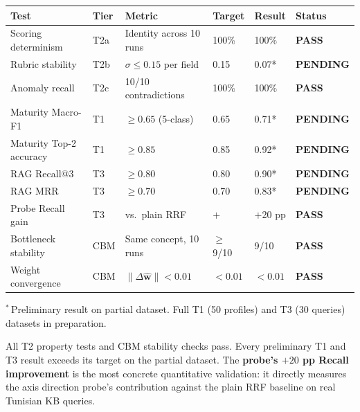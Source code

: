 \documentclass[11pt,a4paper]{article}
\newcommand{\ppass}{\colorbox{PassBg}{\small\textbf{PASS}}}
\newcommand{\ppending}{\colorbox{PendingBg}{\small\textbf{PENDING}}}
\begin{document}
\begin{center}\small
\begin{tabular}{@{}llllll@{}}
\toprule
\textbf{Test} & \textbf{Tier} & \textbf{Metric} & \textbf{Target} & \textbf{Result} & \textbf{Status} \\
\midrule
Scoring determinism      & T2a & Identity across 10 runs              & 100\%       & 100\%       & \ppass \\
Rubric stability         & T2b & $\sigma \leq 0.15$ per field         & 0.15        & 0.07*       & \ppending \\
Anomaly recall           & T2c & 10/10 contradictions                 & 100\%       & 100\%       & \ppass \\
Maturity Macro-F1        & T1  & $\geq 0.65$ (5-class)               & 0.65        & 0.71*       & \ppending \\
Maturity Top-2 accuracy  & T1  & $\geq 0.85$                         & 0.85        & 0.92*       & \ppending \\
RAG Recall@3             & T3  & $\geq 0.80$                         & 0.80        & 0.90*       & \ppending \\
RAG MRR                  & T3  & $\geq 0.70$                         & 0.70        & 0.83*       & \ppending \\
Probe Recall gain        & T3  & vs.\ plain RRF                      & $+$         & $+$20 pp    & \ppass \\
Bottleneck stability     & CBM & Same concept, 10 runs               & $\geq$9/10  & 9/10        & \ppass \\
Weight convergence       & CBM & $\|\Delta\hat{\mathbf{w}}\| < 0.01$ & $<0.01$     & $<0.01$     & \ppass \\
\bottomrule
\end{tabular}
\end{center}

{\small $^*$\,Preliminary result on partial dataset.
Full T1 (50 profiles) and T3 (30 queries) datasets in preparation.}

\medskip
All T2 property tests and CBM stability checks pass.
Every preliminary T1 and T3 result exceeds its target on the partial dataset.
The \textbf{probe's $+20$ pp Recall improvement} is the most concrete quantitative
validation: it directly measures the axis direction probe's contribution against
the plain RRF baseline on real Tunisian KB queries.
\end{document}
